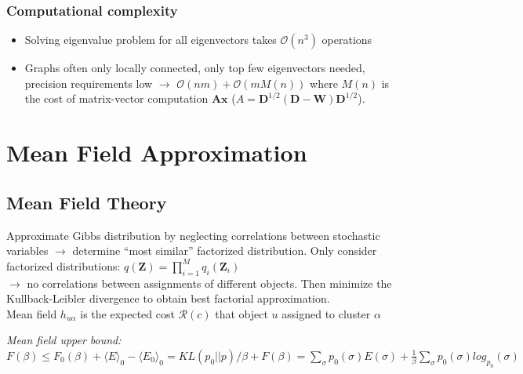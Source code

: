 \documentclass[9pt,parskip]{scrartcl}
\begin{document}
\begin{multicols*}{4}
{{\begin{minipage}{0.75\linewidth}
\begin{enumerate}
\end{enumerate}
\end{minipage}
}
}

\subsubsection*{Computational complexity}
\begin{itemize}
	\item Solving eigenvalue problem for all eigenvectors takes $\mathcal{O}(n^3)$ operations
	\item Graphs often only locally connected, only top few eigenvectors needed, precision requirements low $\to$ $\mathcal{O}(nm) + \mathcal{O}(m M(n))$ where $M(n)$ is the cost of matrix-vector computation $\mathbf{Ax}$ ($A= \mathbf{D}^{1/2}(\mathbf{D} - \mathbf{W})\mathbf{D}^{1/2}$).
\end{itemize}
\section*{Mean Field Approximation}
\subsection*{Mean Field Theory}
Approximate Gibbs distribution by neglecting correlations between stochastic variables $\to$ determine "`most similar"' factorized distribution.
Only consider factorized distributions: 
$q(\mathbf{Z}) = \prod_{i=1}^{M} q_i(\mathbf{Z}_i)$ \\
$\to$ no correlations between assignments of different objects.
Then minimize the Kullback-Leibler divergence to obtain best factorial approximation. \\
Mean field $h_{u \alpha}$ is the expected cost $\mathcal{R}(c)$ that object $u$ assigned to cluster $\alpha$ 

\textit{Mean field upper bound: }
$F(\beta) \leq F_0(\beta) + \langle E \rangle_0 - \langle E_0 \rangle_0 = KL(p_0||p)/\beta + F(\beta) = \sum_{\sigma}p_0(\sigma)E(\sigma) + \frac{1}{\beta} \sum_{\sigma} p_0(\sigma)log_{p_0}(\sigma)$



\end{multicols*}
\end{document}
